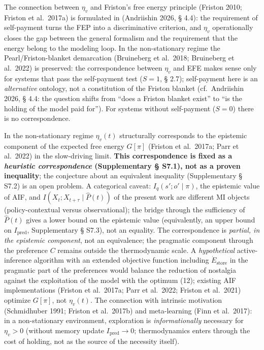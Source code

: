 \documentclass[pdflatex,sn-mathphys-ay]{sn-jnl}
\begin{document}
The connection between \(\eta_v\) and Friston's free energy principle (Friston 2010; Friston et al.~2017a) is formulated in (Andriishin 2026, § 4.4): the requirement of self-payment turns the FEP into a discriminative criterion, and \(\eta_v\) operationally closes the gap between the general formalism and the requirement that the energy belong to the modeling loop. In the non-stationary regime the Pearl/Friston-blanket demarcation (Bruineberg et al.~2018; Bruineberg et al.~2022) is preserved: the correspondence between \(\eta_v\) and EFE makes sense only for systems that pass the self-payment test (\(S=1\), § 2.7); self-payment here is an \emph{alternative} ontology, not a constitution of the Friston blanket (cf.~Andriishin 2026, § 4.4: the question shifts from ``does a Friston blanket exist'' to ``is the holding of the model paid for''). For systems without self-payment (\(S=0\)) there is no correspondence.



In the non-stationary regime \(\eta_v(t)\) structurally corresponds to the epistemic component of the expected free energy \(G[\pi]\) (Friston et al.~2017a; Parr et al.~2022) in the slow-driving limit. \textbf{This correspondence is fixed as a \emph{heuristic correspondence} (Supplementary § S7.1), not as a proven inequality}; the conjecture about an equivalent inequality (Supplementary § S7.2) is an open problem. A categorical caveat: \(I_q(s'; o' \mid \pi)\), the epistemic value of AIF, and \(I(X_t; X_{t+\tau} \mid \hat P(t))\) of the present work are different MI objects (policy-contextual versus observational); the bridge through the sufficiency of \(\hat P(t)\) gives a lower bound on the epistemic value (equivalently, an upper bound on \(I_{\text{pred}}\), Supplementary § S7.3), not an equality. The correspondence is \emph{partial, in the epistemic component}, not an equivalence; the pragmatic component through the preference \(C\) remains outside the thermodynamic scale. A \emph{hypothetical} active-inference algorithm with an extended objective function including \(\dot E_{\text{store}}\) in the pragmatic part of the preferences would balance the reduction of nostalgia against the exploitation of the model with the optimum (12); existing AIF implementations (Friston et al.~2017a; Parr et al.~2022; Friston et al.~2021) optimize \(G[\pi]\), not \(\eta_v(t)\). The connection with intrinsic motivation (Schmidhuber 1991; Friston et al.~2017b) and meta-learning (Finn et al.~2017): in a non-stationary environment, exploration is \emph{informationally} necessary for \(\eta_v > 0\) (without memory update \(I_{\text{pred}} \to 0\); thermodynamics enters through the cost of holding, not as the source of the necessity itself).
\end{document}
